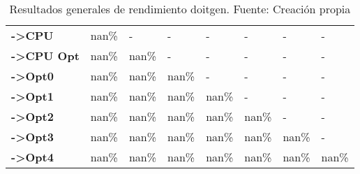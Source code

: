 \begin{table}[H]
\begin{tabular}{llllllll}
    \rowcolor[HTML]{EFEFEF} \cellcolor[HTML]{DAE8FC} \textbf{->CPU} & nan\% & - & - & - & - & - & - \\
    \cellcolor[HTML]{DAE8FC} \textbf{->CPU Opt} & nan\% & nan\% & - & - & - & - & - \\
    \rowcolor[HTML]{EFEFEF} \cellcolor[HTML]{DAE8FC} \textbf{->Opt0} & nan\% & nan\% & nan\% & - & - & - & - \\
    \cellcolor[HTML]{DAE8FC} \textbf{->Opt1} & nan\% & nan\% & nan\% & nan\% & - & - & - \\
    \rowcolor[HTML]{EFEFEF} \cellcolor[HTML]{DAE8FC} \textbf{->Opt2} & nan\% & nan\% & nan\% & nan\% & nan\% & - & - \\
    \cellcolor[HTML]{DAE8FC} \textbf{->Opt3} & nan\% & nan\% & nan\% & nan\% & nan\% & 	nan\% & - \\
    \rowcolor[HTML]{EFEFEF} \cellcolor[HTML]{DAE8FC} \textbf{->Opt4} & nan\% & nan\% & nan\% & nan\% & nan\% & 	nan\% & 	nan\% \\
    \end{tabular}
    \caption[Resultados generales de rendimiento doitgen]{{Resultados generales de rendimiento doitgen. Fuente: Creación propia}}
    \label{table_global_doitgen_PerformanceResults_speedup}
\end{table}